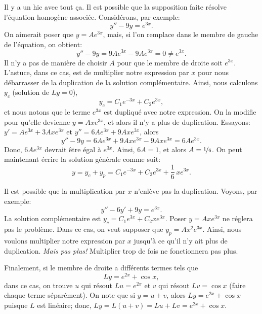 \medskip

Il y a un hic avec tout ça. 
Il est possible que la supposition faite résolve l'équation homogène associée. 
Considérons, par exemple: 
\begin{equation*}
	y'' - 9y = e^{3x} .
\end{equation*}
On aimerait poser que  $y = Ae^{3x}$, mais, si l'on remplace dans le membre de gauche de l'équation, on obtient:  
\begin{equation*}
	y''-9y = 9Ae^{3x} - 9Ae^{3x} = 0 \not= e^{3x} .
\end{equation*}
Il n'y a pas de manière de choisir $A$ pour que le membre de droite soit $e^{3x}$.
L'astuce, dans ce cas, est de multiplier notre expression par  $x$ pour nous débarrasser de la duplication de la solution complémentaire. 
Ainsi, nous calculons $y_c$ (solution de $Ly = 0$), 
\begin{equation*}
	y_c = C_1 e^{-3x} + C_2 e^{3x}, 
\end{equation*}
et nous notons que le terme $e^{3x}$ est dupliqué avec notre expression. 
On la modifie pour qu'elle devienne  $y = Axe^{3x}$, et alors il n'y a plus de duplication. 
Essayons:  $y' = Ae^{3x} + 3Axe^{3x}$ et  $y'' = 6Ae^{3x} + 9Axe^{3x}$, alors 
\begin{equation*}
	y'' -9y = 6Ae^{3x} + 9Axe^{3x} - 9Axe^{3x} = 6Ae^{3x} .
\end{equation*}
Donc, $6Ae^{3x}$ devrait être égal à $e^{3x}$.  Ainsi,
$6A = 1$, et alors $A=\nicefrac{1}{6}$.  On peut maintenant écrire la solution générale comme suit: 
\begin{equation*}
	y = y_c + y_p = C_1 e^{-3x} + C_2 e^{3x} + \frac{1}{6}\,xe^{3x} .
\end{equation*}

\medskip

Il est possible que la multiplication  par $x$ n'enlève pas la duplication.  
Voyons, par exemple: 
\begin{equation*}
	y''-6y'+9y = e^{3x} .
\end{equation*}
La solution complémentaire est $y_c = C_1 e^{3x} + C_2 x e^{3x}$.  
Poser $y=A xe^{3x}$ ne réglera pas le problème.  
Dans ce cas, on veut supposer que $y_p = Ax^2e^{3x}$. 
Ainsi, nous voulons multiplier notre expression par  $x$ jusqu'à ce qu'il n'y ait plus de duplication. 
\emph{Mais pas plus!}  Multiplier trop de fois ne fonctionnera pas plus. 


\medskip

Finalement, si le membre de droite a différents termes tels que 
\begin{equation*}
	Ly = e^{2x} + \cos x, 
\end{equation*}
dans ce cas, on trouve  $u$ qui résout $Lu = e^{2x}$ et $v$ qui résout $Lv = \cos x$ (faire chaque terme séparément).  On note que si $y = u+ v$, alors $Ly = e^{2x} + \cos x$ puisque 
$L$ est linéaire; donc,  $Ly = L(u+v) = Lu + Lv = e^{2x} + \cos x$.



